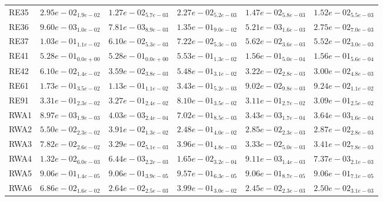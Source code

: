 \documentclass{article}
\begin{document}
\begin{table}
\begin{scriptsize}
\begin{tabular}{llllll}
RE35 & $  2.95e-02_{ 1.9e-02}$ & \cellcolor{gray95}$  1.27e-02_{ 5.7e-03}$ & $  2.27e-02_{ 5.2e-03}$ & \cellcolor{gray25}$  1.47e-02_{ 5.8e-03}$ & $  1.52e-02_{ 5.5e-03}$ \\
RE36 & $  9.60e-03_{ 1.0e-02}$ & \cellcolor{gray25}$  7.81e-03_{ 8.9e-03}$ & $  1.35e-01_{ 9.0e-02}$ & \cellcolor{gray95}$  5.21e-03_{ 1.6e-03}$ & $  2.75e-02_{ 7.0e-03}$ \\
RE37 & $  1.03e-01_{ 1.1e-02}$ & $  6.10e-02_{ 5.3e-03}$ & $  7.22e-02_{ 5.3e-03}$ & \cellcolor{gray25}$  5.62e-02_{ 3.6e-03}$ & \cellcolor{gray95}$  5.52e-02_{ 3.0e-03}$ \\
RE41 & $  5.28e-01_{ 0.0e+00}$ & $  5.28e-01_{ 0.0e+00}$ & $  5.53e-01_{ 1.3e-02}$ & \cellcolor{gray95}$  1.56e-01_{ 5.0e-04}$ & \cellcolor{gray25}$  1.56e-01_{ 5.6e-04}$ \\
RE42 & $  6.10e-02_{ 1.4e-02}$ & $  3.59e-02_{ 3.8e-03}$ & $  5.48e-01_{ 3.1e-02}$ & \cellcolor{gray25}$  3.22e-02_{ 2.8e-03}$ & \cellcolor{gray95}$  3.00e-02_{ 4.8e-03}$ \\
RE61 & $  1.73e-01_{ 3.5e-02}$ & $  1.13e-01_{ 1.1e-02}$ & $  3.43e-01_{ 5.2e-03}$ & \cellcolor{gray95}$  9.02e-02_{ 9.8e-03}$ & \cellcolor{gray25}$  9.24e-02_{ 1.1e-02}$ \\
RE91 & $  3.31e-01_{ 2.3e-02}$ & $  3.27e-01_{ 2.4e-02}$ & $  8.10e-01_{ 3.5e-02}$ & \cellcolor{gray25}$  3.11e-01_{ 2.7e-02}$ & \cellcolor{gray95}$  3.09e-01_{ 2.5e-02}$ \\
RWA1 & $  8.97e-03_{ 1.9e-03}$ & $  4.03e-03_{ 2.4e-04}$ & $  7.02e-01_{ 8.5e-03}$ & \cellcolor{gray95}$  3.43e-03_{ 1.7e-04}$ & \cellcolor{gray25}$  3.64e-03_{ 1.6e-04}$ \\
RWA2 & $  5.50e-02_{ 2.3e-02}$ & $  3.91e-02_{ 1.3e-02}$ & $  2.48e-01_{ 4.0e-02}$ & \cellcolor{gray95}$  2.85e-02_{ 2.3e-03}$ & \cellcolor{gray25}$  2.87e-02_{ 2.8e-03}$ \\
RWA3 & $  7.82e-02_{ 2.6e-02}$ & \cellcolor{gray95}$  3.29e-02_{ 5.1e-03}$ & $  3.96e-01_{ 4.8e-03}$ & \cellcolor{gray25}$  3.33e-02_{ 5.0e-03}$ & $  3.41e-02_{ 7.8e-03}$ \\
RWA4 & $  1.32e-02_{ 6.0e-03}$ & \cellcolor{gray95}$  6.44e-03_{ 2.2e-03}$ & $  1.65e-02_{ 3.2e-04}$ & $  9.11e-03_{ 1.4e-03}$ & \cellcolor{gray25}$  7.37e-03_{ 2.1e-03}$ \\
RWA5 & \cellcolor{gray95}$  9.06e-01_{ 1.4e-05}$ & $  9.06e-01_{ 3.9e-05}$ & $  9.57e-01_{ 6.3e-05}$ & $  9.06e-01_{ 8.7e-05}$ & \cellcolor{gray25}$  9.06e-01_{ 7.1e-05}$ \\
RWA6 & $  6.86e-02_{ 1.6e-02}$ & $  2.64e-02_{ 2.5e-03}$ & $  3.99e-01_{ 3.0e-02}$ & \cellcolor{gray95}$  2.45e-02_{ 2.3e-03}$ & \cellcolor{gray25}$  2.50e-02_{ 3.1e-03}$ \\

\end{tabular}
\end{scriptsize}
\end{table}
\end{document}

